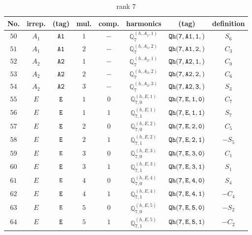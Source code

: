 \documentclass[fleqn,8pt]{jsarticle}
\begin{document}
\begin{table}[ht!]
\begin{center}
\caption{rank 7}
\renewcommand{\arraystretch}{1.3}
\begin{tabular}{cccccccc} \hline \hline
No. & irrep. & (tag) & mul. & comp. & harmonics & (tag) & definition \\ \hline
$ 50 $ & $ A_{1} $ & $ {\tt A1} $ & $ 1 $ & $ - $ & $ \mathbb{Q}_{7}^{(h,A_{1},1)} $ & $ {\tt Qh(7,A1,1,)} $ & $ S_{6} $ \\
$ 51 $ & $ A_{1} $ & $ {\tt A1} $ & $ 2 $ & $ - $ & $ \mathbb{Q}_{7}^{(h,A_{1},2)} $ & $ {\tt Qh(7,A1,2,)} $ & $ C_{3} $ \\
$ 52 $ & $ A_{2} $ & $ {\tt A2} $ & $ 1 $ & $ - $ & $ \mathbb{Q}_{7}^{(h,A_{2},1)} $ & $ {\tt Qh(7,A2,1,)} $ & $ C_{0} $ \\
$ 53 $ & $ A_{2} $ & $ {\tt A2} $ & $ 2 $ & $ - $ & $ \mathbb{Q}_{7}^{(h,A_{2},2)} $ & $ {\tt Qh(7,A2,2,)} $ & $ C_{6} $ \\
$ 54 $ & $ A_{2} $ & $ {\tt A2} $ & $ 3 $ & $ - $ & $ \mathbb{Q}_{7}^{(h,A_{2},3)} $ & $ {\tt Qh(7,A2,3,)} $ & $ S_{3} $ \\
$ 55 $ & $ E $ & $ {\tt E} $ & $ 1 $ & $ 0 $ & $ \mathbb{Q}_{7,0}^{(h,E,1)} $ & $ {\tt Qh(7,E,1,0)} $ & $ C_{7} $ \\
$ 56 $ & $ E $ & $ {\tt E} $ & $ 1 $ & $ 1 $ & $ \mathbb{Q}_{7,1}^{(h,E,1)} $ & $ {\tt Qh(7,E,1,1)} $ & $ S_{7} $ \\
$ 57 $ & $ E $ & $ {\tt E} $ & $ 2 $ & $ 0 $ & $ \mathbb{Q}_{7,0}^{(h,E,2)} $ & $ {\tt Qh(7,E,2,0)} $ & $ C_{5} $ \\
$ 58 $ & $ E $ & $ {\tt E} $ & $ 2 $ & $ 1 $ & $ \mathbb{Q}_{7,1}^{(h,E,2)} $ & $ {\tt Qh(7,E,2,1)} $ & $ - S_{5} $ \\
$ 59 $ & $ E $ & $ {\tt E} $ & $ 3 $ & $ 0 $ & $ \mathbb{Q}_{7,0}^{(h,E,3)} $ & $ {\tt Qh(7,E,3,0)} $ & $ C_{1} $ \\
$ 60 $ & $ E $ & $ {\tt E} $ & $ 3 $ & $ 1 $ & $ \mathbb{Q}_{7,1}^{(h,E,3)} $ & $ {\tt Qh(7,E,3,1)} $ & $ S_{1} $ \\
$ 61 $ & $ E $ & $ {\tt E} $ & $ 4 $ & $ 0 $ & $ \mathbb{Q}_{7,0}^{(h,E,4)} $ & $ {\tt Qh(7,E,4,0)} $ & $ S_{4} $ \\
$ 62 $ & $ E $ & $ {\tt E} $ & $ 4 $ & $ 1 $ & $ \mathbb{Q}_{7,1}^{(h,E,4)} $ & $ {\tt Qh(7,E,4,1)} $ & $ - C_{4} $ \\
$ 63 $ & $ E $ & $ {\tt E} $ & $ 5 $ & $ 0 $ & $ \mathbb{Q}_{7,0}^{(h,E,5)} $ & $ {\tt Qh(7,E,5,0)} $ & $ - S_{2} $ \\
$ 64 $ & $ E $ & $ {\tt E} $ & $ 5 $ & $ 1 $ & $ \mathbb{Q}_{7,1}^{(h,E,5)} $ & $ {\tt Qh(7,E,5,1)} $ & $ - C_{2} $ \\
 \hline \hline
\end{tabular}
\end{center}
\end{table}
\end{document}
